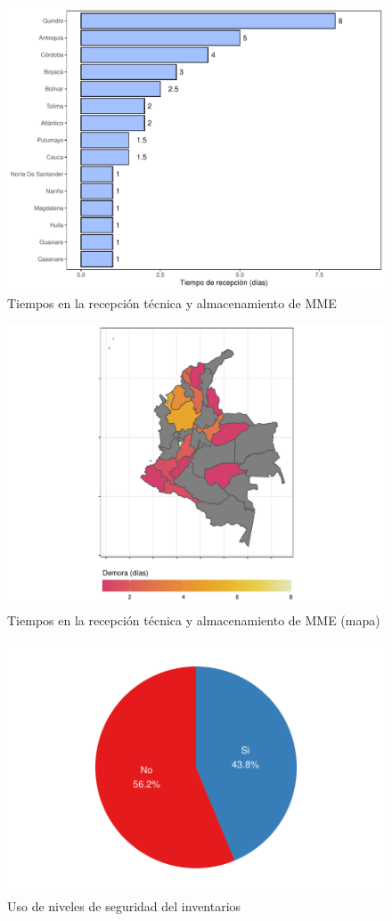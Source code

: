 \documentclass[
]{book}
\begin{document}
\begin{figure}
\includegraphics[width=0.85\linewidth]{InformeFinal_files/figure-latex/TiemposRecepcionAlmacenamiento-1} \caption{Tiempos en la recepción técnica y almacenamiento de MME}\label{fig:TiemposRecepcionAlmacenamiento}
\end{figure}

\begin{figure}
\includegraphics[width=0.85\linewidth]{InformeFinal_files/figure-latex/TiemposRecepcionAlmacenamientoMapa-1} \caption{Tiempos en la recepción técnica y almacenamiento de MME (mapa)}\label{fig:TiemposRecepcionAlmacenamientoMapa}
\end{figure}

\begin{figure}
\includegraphics[width=0.85\linewidth]{InformeFinal_files/figure-latex/UsoNivelesSeguridad-1} \caption{Uso de niveles de seguridad del inventarios}\label{fig:UsoNivelesSeguridad}
\end{figure}
\end{document}

